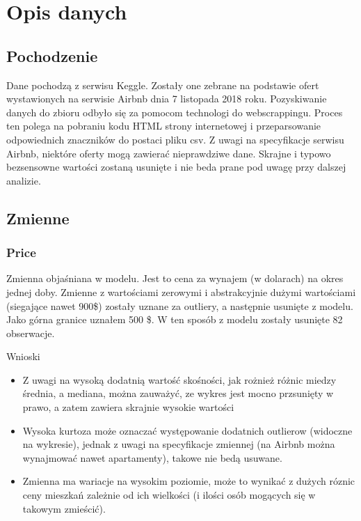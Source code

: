 \section{Opis danych}\label{sec:opis-danych}

\subsection{Pochodzenie}\label{subsec:pochodzenie}
Dane pochodzą z serwisu Keggle\cite{berlin-airbnb-data}.
Zostały one zebrane na podstawie ofert wystawionych na serwisie Airbnb dnia 7 listopada 2018 roku.
Pozyskiwanie danych do zbioru odbyło się za pomocom technologi do webscrappingu.
Proces ten polega na pobraniu kodu HTML strony internetowej i przeparsowanie odpowiednich znaczników do postaci pliku csv.
Z uwagi na specyfikacje serwisu Airbnb, niektóre oferty mogą zawierać nieprawdziwe dane.
Skrajne i typowo bezsensowne wartości zostaną usunięte i nie beda prane pod uwagę przy dalszej analizie.

\subsection{Zmienne}\label{subsec:zmienne}


\subsubsection{Price}\label{subsubsec:price}
Zmienna objaśniana w modelu.
Jest to cena za wynajem (w dolarach) na okres jednej doby.
Zmienne z wartościami zerowymi i abstrakcyjnie dużymi wartościami (siegające nawet 900\$) zostały uznane za outliery, a następnie usunięte z modelu.
Jako górna granice uznałem 500 \$.
W ten sposób z modelu zostały usunięte 82 obserwacje.



Wnioski

\begin{itemize}
    \item Z uwagi na wysoką dodatnią wartość skośności, jak rożnież różnic miedzy średnia, a mediana, można zauważyć, ze wykres jest mocno przsunięty w prawo, a zatem zawiera skrajnie wysokie wartości
    \item Wysoka kurtoza może oznaczać występowanie dodatnich outlierow (widoczne na wykresie), jednak z uwagi na specyfikacje zmiennej (na Airbnb można wynajmować nawet apartamenty), takowe nie bedą usuwane.
    \item Zmienna ma wariacje na wysokim poziomie, może to wynikać z dużych róznic ceny mieszkań zależnie od ich wielkości (i ilości osób mogących się w takowym zmieścić).
\end{itemize}

